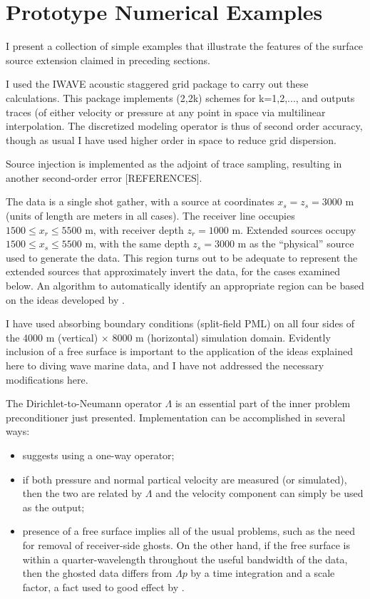 \section{Prototype Numerical Examples}
I present a collection of simple examples that illustrate the features of the surface source extension claimed in preceding sections. 

I used the IWAVE acoustic staggered grid package to carry out these calculations. This package implements (2,2k) schemes for k=1,2,..., and outputs traces (of either velocity or pressure at any point in space via multilinear interpolation. The discretized modeling operator is thus of second order accuracy, though as usual I have used higher order in space to reduce grid dispersion.

Source injection is implemented as the adjoint of trace sampling, resulting in another second-order error [REFERENCES]. 

The data is a single shot gather, with a source at coordinates $x_s=z_s=3000$ m (units of length are meters in all cases). The receiver line occupies $1500 \le x_r \le 5500$ m, with receiver depth $z_r=1000$ m.  Extended sources occupy $1500 \le x_s \le 5500$ m, with the same depth $z_s=3000$ m as the ``physical'' source used to generate the data. This region turns out to be adequate to represent the extended sources that approximately invert the data, for the cases examined below. An algorithm to automatically identify an appropriate region can be based on the ideas developed by \cite{Fu:Geo17}.

I have used absorbing boundary conditions (split-field PML) on all four sides of the 4000 m (vertical) $\times$ 8000 m (horizontal) simulation domain. Evidently inclusion of a free surface is important to the application of the ideas explained here to diving wave marine data, and I have not addressed the necessary modifications here. 

The Dirichlet-to-Neumann operator $\Lambda$ is an essential part of the inner problem preconditioner just presented. Implementation can be accomplished in several ways:
\begin{itemize}
\item \cite{tenKroode:12} suggests using a one-way operator;
\item if both pressure and normal partical velocity are measured (or simulated), then the two are related by $\Lambda$ and the velocity component can simply be used as the output;
\item presence of a free surface implies all of the usual problems, such as the need for removal of receiver-side ghosts. On the other hand, if the free surface is within a quarter-wavelength throughout the useful bandwidth of the data, then the ghosted data differs from $\Lambda p$ by a time integration and a scale factor, a fact used to good effect by \cite{HouSymes:15}.
\end{itemize}

